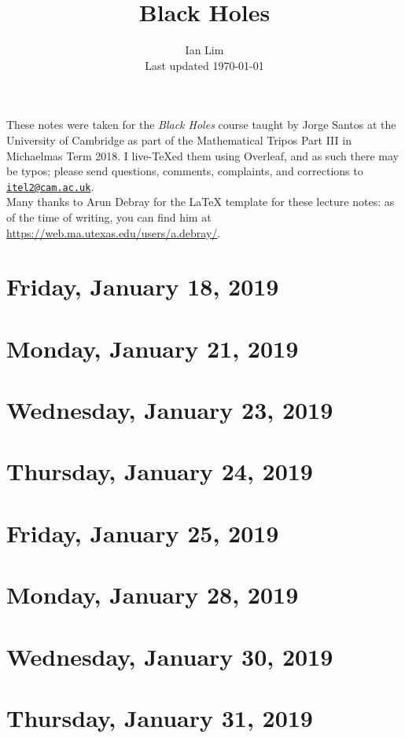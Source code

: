 \documentclass[reqno]{amsart}
\begin{document}
\title{Black Holes}
\author{Ian Lim\\ Last updated \today}
\maketitle
{\small\noindent These notes were taken for the \textit{Black Holes} course taught by Jorge Santos at the University of Cambridge as part of the Mathematical Tripos Part III in Michaelmas Term 2018. I live-\TeX ed them using Overleaf, and as such there may be typos; please send questions, comments, complaints, and corrections to 
\href{mailto:itel2@cam.ac.uk?subject=BH\%20Lecture\%20Notes}{\texttt{itel2@cam.ac.uk}}.\\
Many thanks to Arun Debray for the {\LaTeX} template for these lecture notes: as of the time of writing, you can find him at \url{https://web.ma.utexas.edu/users/a.debray/}.}

\tableofcontents

\section{Friday, January 18, 2019}
	

\section{Monday, January 21, 2019}
    

\section{Wednesday, January 23, 2019}
    

\section{Thursday, January 24, 2019}
    

\section{Friday, January 25, 2019}
    
    
\section{Monday, January 28, 2019}
    
    
\section{Wednesday, January 30, 2019}
    

\section{Thursday, January 31, 2019}
    
\end{document}
